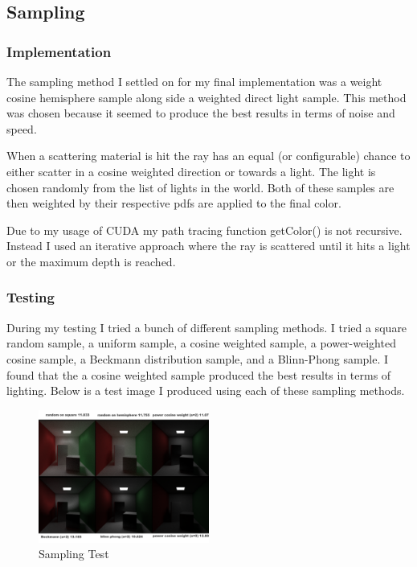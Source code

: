 \documentclass{article}
\begin{document}
    \subsection{Sampling}



        \subsubsection{Implementation}
        The sampling method I settled on for my final implementation was a weight cosine hemisphere sample along side a weighted direct light sample. This method was chosen because it seemed to produce the best results in terms of noise and speed. \par
        When a scattering material is hit the ray has an equal (or configurable) chance to either scatter in a cosine weighted direction or towards a light. The light is chosen randomly from the list of lights in the world. Both of these samples are then weighted by their respective pdfs are applied to the final color. \par
        Due to my usage of CUDA my path tracing function getColor() is not recursive. Instead I used an iterative approach where the ray is scattered until it hits a light or the maximum depth is reached. \par 



        \subsubsection{Testing}
        During my testing I tried a bunch of different sampling methods. I tried a square random sample, a uniform sample, a cosine weighted sample, a power-weighted cosine sample, a Beckmann distribution sample, and a Blinn-Phong sample. I found that the a cosine weighted sample produced the best results in terms of lighting. Below is a test image I produced using each of these sampling methods. \par

        \begin{figure}[h]
            \centering
            \includegraphics[width=0.5\textwidth]{samples/Lighting_Comparison.png}
            \caption{Sampling Test}
        \end{figure}
\end{document}

